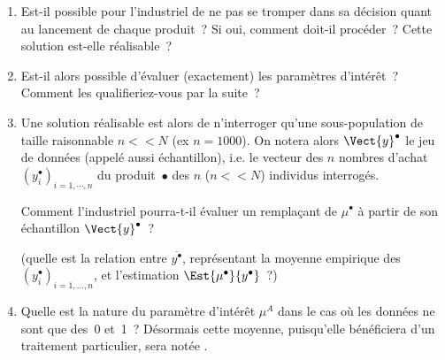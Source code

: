 \documentclass[10pt]{report}
\begin{document}
\begin{exercice}
\begin{enumerate}
\item Est-il possible pour l'industriel de ne pas se tromper dans sa décision quant au lancement de chaque produit~? Si oui, comment doit-il procéder~? Cette solution est-elle réalisable~? 

\item Est-il alors possible d'évaluer (exactement) les paramètres d'intérêt~? Comment les qualifieriez-vous par la suite~?

\item Une solution r{\'e}alisable est alors de n'interroger qu'une sous-population de taille raisonnable $n<<N$ (ex $n=1000$). On notera alors $\Vect{y}^\bullet$ le jeu de données (appelé aussi échantillon), i.e. le vecteur des $n$ nombres d'achat $\left(y_i^\bullet\right)_{i=1,\cdots,n}$ du produit~$\bullet$ des $n$ ($n<<N$) individus interrogés.
 


Comment l'industriel pourra-t-il évaluer un remplaçant de $\mu^\bullet$ à partir de son échantillon $\Vect{y}^\bullet$~? 



(quelle est la relation entre $\overline{y^\bullet}$, représentant la moyenne empirique des $\left(y_i^\bullet\right)_{i=1,\ldots,n}$, et l'estimation $\Est{\mu^\bullet}{y^\bullet}$~?)

\item Quelle est la nature du paramètre d'intérêt $\mu^A$ dans le cas où les données ne sont que des~0 et~1~? Désormais cette moyenne, puisqu'elle bénéficiera d'un traitement particulier, sera notée .

\end{enumerate}
\end{exercice}
\end{document}
